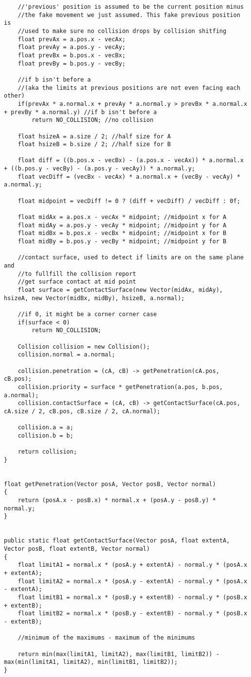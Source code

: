 \documentclass[12pt]{article}
\begin{document}
\begin{lstlisting}
	//'previous' position is assumed to be the current position minus
	//the fake movement we just assumed. This fake previous position is
	//used to make sure no collision drops by collision shitfing
	float prevAx = a.pos.x - vecAx;
	float prevAy = a.pos.y - vecAy;
	float prevBx = b.pos.x - vecBx;
	float prevBy = b.pos.y - vecBy;

	//if b isn't before a
	//(aka the limits at previous positions are not even facing each other)
	if(prevAx * a.normal.x + prevAy * a.normal.y > prevBx * a.normal.x + prevBy * a.normal.y) //if b isn't before a
		return NO_COLLISION; //no collision

	float hsizeA = a.size / 2; //half size for A
	float hsizeB = b.size / 2; //half size for B

	float diff = ((b.pos.x - vecBx) - (a.pos.x - vecAx)) * a.normal.x + ((b.pos.y - vecBy) - (a.pos.y - vecAy)) * a.normal.y;
	float vecDiff = (vecBx - vecAx) * a.normal.x + (vecBy - vecAy) * a.normal.y;

	float midpoint = vecDiff != 0 ? (diff + vecDiff) / vecDiff : 0f;

	float midAx = a.pos.x - vecAx * midpoint; //midpoint x for A
	float midAy = a.pos.y - vecAy * midpoint; //midpoint y for A
	float midBx = b.pos.x - vecBx * midpoint; //midpoint x for B
	float midBy = b.pos.y - vecBy * midpoint; //midpoint y for B

	//contact surface, used to detect if limits are on the same plane and
	//to fullfill the collision report
	//get surface contact at mid point
	float surface = getContactSurface(new Vector(midAx, midAy), hsizeA, new Vector(midBx, midBy), hsizeB, a.normal);

	//if 0, it might be a corner corner case
	if(surface < 0)
		return NO_COLLISION;

	Collision collision = new Collision();
	collision.normal = a.normal;

	collision.penetration = (cA, cB) -> getPenetration(cA.pos, cB.pos);
	collision.priority = surface * getPenetration(a.pos, b.pos, a.normal);
	collision.contactSurface = (cA, cB) -> getContactSurface(cA.pos, cA.size / 2, cB.pos, cB.size / 2, cA.normal);

	collision.a = a;
	collision.b = b;

	return collision;
}


float getPenetration(Vector posA, Vector posB, Vector normal)
{
	return (posA.x - posB.x) * normal.x + (posA.y - posB.y) * normal.y;
}


public static float getContactSurface(Vector posA, float extentA, Vector posB, float extentB, Vector normal)
{
	float limitA1 = normal.x * (posA.y + extentA) - normal.y * (posA.x + extentA);
	float limitA2 = normal.x * (posA.y - extentA) - normal.y * (posA.x - extentA);
	float limitB1 = normal.x * (posB.y + extentB) - normal.y * (posB.x + extentB);
	float limitB2 = normal.x * (posB.y - extentB) - normal.y * (posB.x - extentB);
	
	//minimum of the maximums - maximum of the minimums

	return min(max(limitA1, limitA2), max(limitB1, limitB2)) - max(min(limitA1, limitA2), min(limitB1, limitB2));
}
\end{lstlisting}
\end{document}

